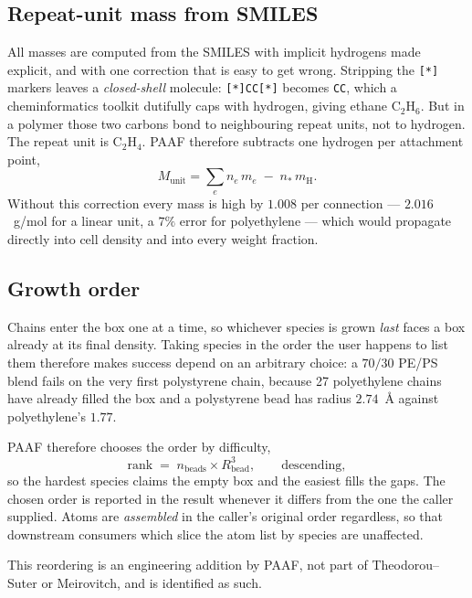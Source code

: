 \documentclass[11pt,a4paper]{article}
\begin{document}
\subsection{Repeat-unit mass from SMILES}

All masses are computed from the SMILES with implicit hydrogens made explicit,
and with one correction that is easy to get wrong. Stripping the \texttt{[*]}
markers leaves a \emph{closed-shell} molecule: \texttt{[*]CC[*]} becomes
\texttt{CC}, which a cheminformatics toolkit dutifully caps with hydrogen,
giving ethane C$_2$H$_6$. But in a polymer those two carbons bond to
neighbouring repeat units, not to hydrogen. The repeat unit is C$_2$H$_4$.
PAAF therefore subtracts one hydrogen per attachment point,
\begin{equation}
  M_{\text{unit}} = \sum_{e} n_e\, m_e \;-\; n_{\ast}\, m_{\mathrm{H}} .
  \label{eq:mass}
\end{equation}
Without this correction every mass is high by $1.008$ per connection ---
$2.016$~g/mol for a linear unit, a $7\%$ error for polyethylene --- which
would propagate directly into cell density and into every weight fraction.

\subsection{Growth order}

Chains enter the box one at a time, so whichever species is grown \emph{last}
faces a box already at its final density. Taking species in the order the user
happens to list them therefore makes success depend on an arbitrary choice: a
$70/30$ PE/PS blend fails on the very first polystyrene chain, because 27
polyethylene chains have already filled the box and a polystyrene bead has
radius $2.74$~\AA{} against polyethylene's $1.77$.

PAAF therefore chooses the order by difficulty,
\begin{equation}
  \text{rank} \;=\; n_{\text{beads}} \times R_{\text{bead}}^{3},
  \qquad \text{descending},
  \label{eq:order}
\end{equation}
so the hardest species claims the empty box and the easiest fills the gaps.
The chosen order is reported in the result whenever it differs from the one
the caller supplied. Atoms are \emph{assembled} in the
caller's original order regardless, so that downstream consumers which slice
the atom list by species are unaffected.

\begin{caveat}
This reordering is an engineering addition by PAAF, not part of
Theodorou--Suter or Meirovitch, and is identified as such.
\end{caveat}
\end{document}
